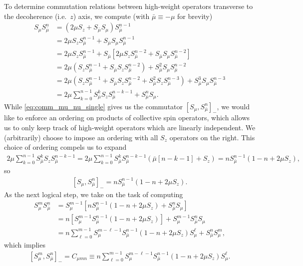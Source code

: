 \documentclass[aps,notitlepage,nofootinbib,11pt]{revtex4-1}
\newcommand{\p}[1]{\left(#1\right)} %
\renewcommand{\sp}[1]{\left[#1\right]} %
\newcommand{\bmu}{{\bar\mu}}
\newcommand{\1}{\mathds{1}}
\begin{document}
To determine commutation relations between high-weight operators
transverse to the decoherence (i.e.~$z$) axis, we compute (with
$\bmu\equiv-\mu$ for brevity)
\begin{align}
  S_\mu S_\bmu^n
  &= \p{2\mu S_z + S_\bmu S_\mu} S_\bmu^{n-1} \\
  &= 2\mu S_z S_\bmu^{n-1} + S_\bmu S_\mu S_\bmu^{n-1} \\
  &= 2\mu S_z S_\bmu^{n-1}
  + S_\bmu \sp{2\mu S_z S_\bmu^{n-2}
    + S_\bmu S_\mu S_\bmu^{n-2}} \\
  &= 2\mu \p{S_z S_\bmu^{n-1} + S_\bmu S_z S_\bmu ^{n-2}}
  + S_\bmu^2 S_\mu S_\bmu^{n-2} \\
  &= 2\mu \p{S_z S_\bmu^{n-1} + S_\bmu S_z S_\bmu ^{n-2}
    + S_\bmu^2 S_z S_\bmu ^{n-3}} + S_\bmu^3 S_\mu S_\bmu^{n-3} \\
  &= 2\mu \sum_{k=0}^{n-1} S_\bmu^k S_z S_\bmu^{n-k-1}
  + S_\bmu^n S_\mu.
  \label{eq:comm_mu_nu_single}
\end{align}
While \eqref{eq:comm_mu_nu_single} gives us the commutator
$\sp{S_\mu,S_\bmu^n}_-$, we would like to enforce an ordering on
products of collective spin operators, which allows us to only keep
track of high-weight operators which are linearly independent.  We
(arbitrarily) choose to impose an ordering with all $S_z$ operators on
the right.  This choice of ordering compels us to expand
\begin{align}
  2 \mu \sum_{k=0}^{n-1} S_\bmu^k S_z S_\bmu^{n-k-1}
  = 2 \mu \sum_{k=0}^{n-1}
  S_\bmu^k S_\bmu^{n-k-1} \p{\bmu\sp{n-k-1} + S_z}
  = n S_\bmu^{n-1}\p{1 - n + 2\mu S_z},
\end{align}
so
\begin{align}
  \sp{S_\mu, S_\bmu^n}_-
  = n S_\bmu^{n-1}\p{1 - n + 2\mu S_z}.
\end{align}
As the next logical step, we take on the task of computing
\begin{align}
  S_\mu^m S_\bmu^n
  &= S_\mu^{m-1} \sp{n S_\bmu^{n-1}\p{1 - n + 2\mu S_z}
    + S_\bmu^n S_\mu} \\
  &= n \sp{S_\mu^{m-1} S_\bmu^{n-1} \p{1 - n + 2\mu S_z}}
  + S_\mu^{m-1} S_\bmu^n S_\mu \\
  &= n \sum_{\ell=0}^{m-1} S_\mu^{m-\ell-1} S_\bmu^{n-1}
  \p{1 - n + 2\mu S_z} S_\mu^\ell + S_\bmu^n S_\mu^m,
\end{align}
which implies
\begin{align}
  \sp{S_\mu^m, S_\bmu^n}_-
  = C_{\mu mn}
  \equiv n \sum_{\ell=0}^{m-1} S_\mu^{m-\ell-1} S_\bmu^{n-1}
  \p{1 - n + 2\mu S_z} S_\mu^\ell.
\end{align}
\end{document}
